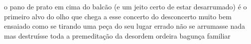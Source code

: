 \begin{poem}
\begin{stanza}
o pano de prato\verseline
em cima do balcão\verseline
(e um jeito certo\verseline
de estar desarrumado)\verseline
é o primeiro alvo\verseline
do olho que chega\verseline
a esse concerto do desconcerto\verseline
muito bem ensaiado\verseline
como se tirando uma peça\verseline
do seu lugar errado\verseline
não se arrumasse nada\verseline
mas destruísse toda\verseline
a premeditação\verseline
da desordem ordeira\verseline
bagunça familiar
\end{stanza}
\end{poem}